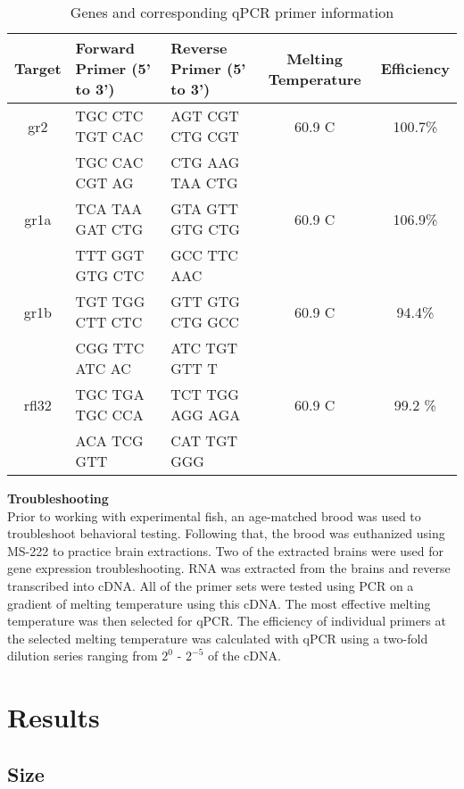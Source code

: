 \documentclass[12pt,twoside]{reedthesis}
\begin{document}
\begin{table}[htbp]
\caption[Genes and corresponding qPCR primer information]{Genes and corresponding
 qPCR primer information}
\begin{center}
\footnotesize
\begin{tabular}{ | c | l | l | c | c |}
\hline
Target & Forward Primer (5' to 3')& Reverse Primer (5' to 3') & Melting Temperature & Efficiency\\
\hline
gr2 & TGC CTC TGT CAC & AGT CGT CTG CGT & 60.9 \textdegree{}C& 100.7\%\\
  &  TGC CAC CGT AG & CTG AAG TAA CTG & & \\
\hline
  gr1a & TCA TAA GAT CTG& GTA GTT GTG CTG & 60.9 \textdegree{}C& 106.9\% \\
  &  TTT GGT GTG CTC &  GCC TTC AAC & & \\
\hline
    gr1b & TGT TGG CTT CTC  & GTT GTG CTG GCC & 60.9 \textdegree{}C& 94.4\%\\
  & CGG TTC ATC AC & ATC TGT GTT T & & \\
\hline
    rfl32 & TGC TGA TGC CCA & TCT TGG AGG AGA & 60.9 \textdegree{}C& 99.2 \%\\
  & ACA TCG GTT & CAT TGT GGG & & \\
\hline
\end{tabular}
\end{center}
\end{table}

\noindent\textbf{Troubleshooting}\\
Prior to working with experimental fish, an age-matched brood was used to
troubleshoot behavioral testing. Following that, the brood was euthanized using
MS-222 to practice brain extractions. Two of the extracted brains were used for
gene expression troubleshooting. RNA was extracted from the brains and reverse
transcribed into cDNA. All of the primer sets were tested using PCR on a gradient of
melting temperature using this cDNA. The most effective melting temperature was
then selected for qPCR. The efficiency of individual primers at the selected
melting temperature was calculated with qPCR using a two-fold dilution series
ranging from $2^0$ - $2^{-5}$ of the cDNA.

\chapter{Results}
\section{Size}
\end{document}
